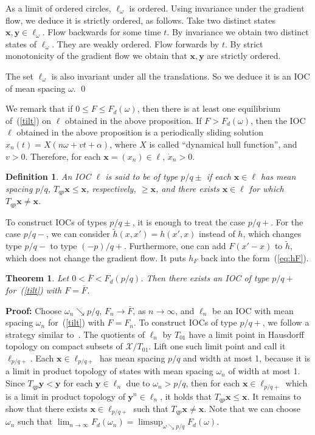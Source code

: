 \documentclass[12pt]{article}
\newcounter{number}
\newtheorem{theorem}{Theorem}
\newtheorem{definition}{Definition}
\newcommand{\begde}{\begin{definition}\hspace{1em}}
\newcommand{\ede}{\end{definition}
                           \addtocounter{number}{1}}
\newcommand{\begth}{\begin{theorem}\hspace{1em}}
\newcommand{\eeth}{\end{theorem}
   \addtocounter{number}{1}}
\newcommand{\newsection}[1]{    \section{#1}
                               \setcounter{equation}{0}
                                \setcounter{number}{1} }
\newcommand{\refer}[1]{~(\ref{#1})}
\newcommand{\xbf}{{\mathbf{x}}}
\newcommand{\ybf}{{\mathbf{y}}}
\newcommand{\zero}{{\mathbf{0}}}
\newcommand{\pf}{{\bf Proof:}\hspace{1em}}
\begin{document}
As a limit of ordered circles, $\ell_\omega$ is  ordered.  Using invariance under the gradient flow, we deduce it is strictly ordered, as follows.    Take two distinct states $\xbf, \ybf \in \ell_\omega$.  Flow backwards for some time $t$.  By invariance we obtain two distinct states of $\ell_\omega$.  They are weakly ordered.  Flow forwards by $t$.  By strict monotonicity of the gradient flow we obtain that $\xbf,\ybf$ are strictly ordered.

The set $\ell_\omega$ is also invariant under all the translations.  So we deduce it is an IOC of mean spacing $\omega$. \qed

We remark that if $0\leq F\leq F_d(\omega)$, then there is at least one equilibrium of\refer{tilt} on $\ell$ obtained in the above proposition. If $F>F_d(\omega)$, then the IOC $\ell$ obtained in the above proposition is a periodically sliding solution $x_n(t)=X(n\omega+vt+\alpha)$, where $X$ is called ``dynamical hull function'', and $v>0$. Therefore, for each $\xbf=(x_n)\in\ell$, $\dot{x}_n>0$. %

\begde\label{def-p/q}
An IOC $\ell$ is said to be of type $p/q\pm$ if each $\xbf \in \ell$ has mean spacing $p/q$, $T_{qp}\xbf \le \xbf$, respectively, $\ge \xbf$, and there exists $\xbf \in \ell$ for which $T_{qp}\xbf \ne \xbf$.
\ede

To construct IOCs of types $p/q\pm$, it
is enough to treat the case $p/q+$.  For the case $p/q-$, we can consider $\tilde{h}(x,x') = h(x',x)$ instead of $h$, which changes type $p/q-$ to type $(-p)/q+$.  Furthermore, one can add $F(x'-x)$ to $\tilde{h}$, which does not change the gradient flow.  It puts $h_F$ back into the form\refer{eq:hF}.

\begth\label{construction-IOC-p/q}
Let $0< \bar{F}<F_d(p/q)$. Then there exists an IOC of type $p/q+$ for\refer{tilt} with $F=\bar{F}$.
\eeth
\pf
Choose $\omega_n\searrow p/q$, $F_n\to \bar{F}$, as $n\to\infty$, and $\ell_n$ be an IOC with mean spacing $\omega_n$ for\refer{tilt} with $F=F_n$.
To construct IOCs of type $p/q+$, we follow a strategy similar to~\cite{QW2}. The quotients of
$\ell_n$ by $T_{01}$ have a limit point in Hausdorff topology on compact subsets of $\mathcal{X}/T_{01}$. Lift one such limit point and call it $\ell_{p/q+}$.
Each $\xbf \in \ell_{p/q+}$ has mean spacing $p/q$ and width at most 1, because it is a limit in product topology of states with mean spacing $\omega_n$ of width at most 1.
Since $T_{qp}\ybf<\ybf$ for each $\ybf\in\ell_n$ due to $\omega_n>p/q$, then for each $\xbf\in\ell_{p/q+}$ which is a limit in product topology of $\ybf^n\in\ell_n$, it holds that $T_{qp}\xbf\leq\xbf$.
It remains to show that there exists $\xbf\in\ell_{p/q+}$ such that $T_{qp}\xbf\ne \xbf$.
Note that we can choose $\omega_n$ such that $\lim_{n\to\infty}F_d(\omega_n)=\limsup_{\omega\searrow p/q}F_d(\omega)$.
\end{document}
